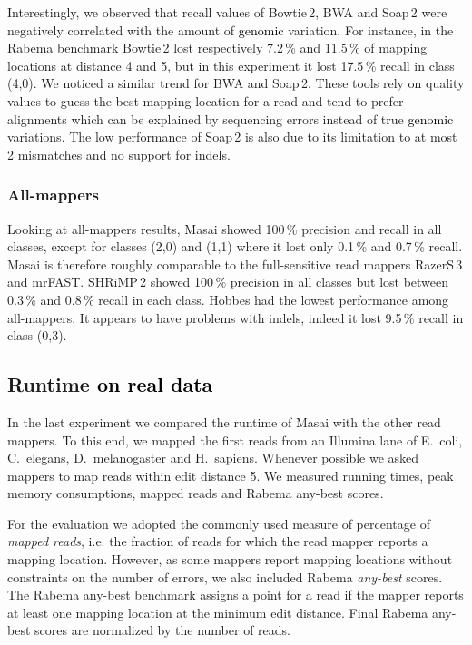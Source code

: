 \documentclass[a4,center,fleqn]{article}
\newcommand{\ie}{{i.e.}\xspace}
\begin{document}
Interestingly, we observed that recall values of Bowtie\,2, BWA and Soap\,2 were negatively correlated with the amount of \textcolor{black}{genomic} variation.
For instance, in the Rabema benchmark Bowtie\,2 lost respectively 7.2\,\% and 11.5\,\% of mapping locations at distance 4 and 5, but in this experiment it lost 17.5\,\% recall in class (4,0).
We noticed a similar trend for BWA and Soap\,2.
These tools rely on quality values to guess the best mapping location for a read and tend to prefer alignments which can be explained by sequencing errors instead of true \textcolor{black}{genomic} variations.
The low performance of Soap\,2 is also due to its limitation to at most 2 mismatches and no support for indels.

\subsubsection{All-mappers}
Looking at all-mappers results, Masai showed 100\,\% precision and recall in all classes, except for classes (2,0) and (1,1) where it lost only 0.1\,\% and 0.7\,\% recall.
Masai is therefore roughly comparable to the full-sensitive read mappers RazerS\,3 and mrFAST.
SHRiMP\,2 showed 100\,\% precision in all classes but lost between 0.3\,\% and 0.8\,\% recall in each class.
Hobbes had the lowest performance among all-mappers.
It appears to have problems with indels, indeed it lost 9.5\,\% recall in class (0,3).


\subsection{Runtime \textcolor{black}{on real data}}

In the last experiment we compared the runtime of Masai with the other read mappers.
To this end, we mapped the first  reads from an Illumina lane of E.~coli, C.~elegans, D.~melanogaster and H.~sapiens.
Whenever possible we asked mappers to map reads within edit distance 5.
We measured running times, peak memory consumptions, mapped reads and Rabema any-best scores.

For the evaluation we adopted the commonly used measure of percentage of \emph{mapped reads}, \ie the fraction of reads for which the read mapper reports a mapping location.
However, as some mappers report mapping locations without constraints on the number of errors, we also included Rabema \emph{any-best} scores.
The Rabema any-best benchmark assigns a point for a read if the mapper reports at least one mapping location at the minimum edit distance.
Final Rabema any-best scores are normalized by the number of reads.
\end{document}

